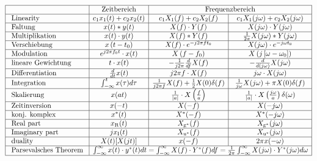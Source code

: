 
$$
\begin{array}{|l|c|c|c|}
\hline & \text { Zeitbereich } & \multicolumn{2}{c|}{\text { Frequenzbereich }} \\
\hline \text { Linearity } & c_1 x_1(t)+c_2 x_2(t) & c_1 X_1(f)+c_2 X_2(f) & c_1 X_1(j \omega)+c_2 X_2(j \omega) \\
\hline \text { Faltung } & x(t) * y(t) & X(f) \cdot Y(f) & X(j \omega) \cdot Y(j \omega) \\
\hline \text { Multiplikation } & x(t) \cdot y(t) & X(f) * Y(f) & \frac{1}{2 \pi} X(j \omega) * Y(j \omega) \\
\hline \text { Verschiebung } & x\left(t-t_0\right) & X(f) \cdot e^{-j 2 \pi f t_0} & X(j \omega) \cdot e^{-j \omega t_0} \\
\hline \text { Modulation } & e^{j 2 \pi f_0 t} \cdot x(t) & X\left(f-f_0\right) & X\left(j\left[\omega-\omega_0\right]\right) \\
\hline \text { lineare Gewichtung } & t \cdot x(t) & -\frac{1}{j 2 \pi} \frac{d}{d f} X(f) & -\frac{d}{d(j \omega)} X(j \omega) \\
\hline \text { Differentiation } & \frac{d}{d t} x(t) & j 2 \pi f \cdot X(f) & j \omega \cdot X(j \omega) \\
\hline \text { Integration } & \int_{-\infty}^t x(\tau) d \tau & \frac{1}{j 2 \pi f} X(f)+ 
\frac{1}{2} X(0) \delta(f) & \frac{1}{j \omega} X(j \omega)+\pi X(0)  \delta(f)\\
\hline \text { Skalierung } & x(a t) & \frac{1}{|a|} \cdot X\left(\frac{f}{a}\right) & \frac{1}{|a|} \cdot X\left(\frac{j \omega}{a}\right)\delta(\omega) \\
\hline \text { Zeitinversion } & x(-t) & X(-f) & X(-j \omega) \\
\hline \text { konj. komplex } & x^*(t) & X^*(-f) & X^*(-j \omega) \\
\hline \text { Real part } & x_{\mathrm{R}}(t) & X_{\mathrm{g}^*}(f) & X_{\mathrm{g}^*}(j \omega) \\
\hline \text { Imaginary part } & j x_{\mathrm{I}}(t) & X_{\mathrm{u}^*}(f) & X_{\mathrm{u}^*}(j \omega) \\
\hline \text { duality } & X(t)[X(j t)] & x(-f) & 2 \pi x(-\omega) \\
\hline \text { Parsevalsches Theorem } & \multicolumn{3}{c|}{\int_{-\infty}^{\infty} x(t) \cdot y^*(t) d t=\int_{-\infty}^{\infty} X(f) \cdot Y^*(f) d f=\frac{1}{2 \pi} \int_{-\infty}^{\infty} X(j \omega) \cdot Y^*(j \omega) d \omega} \\
\hline
\end{array}
$$
